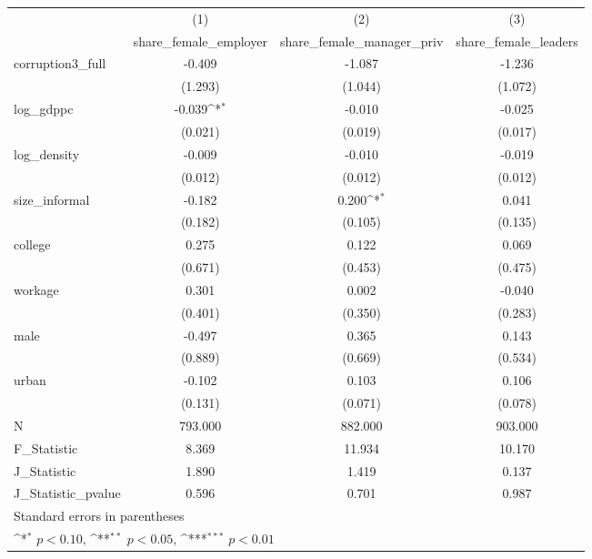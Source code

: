 {
\def\sym#1{\ifmmode^{#1}\else\(^{#1}\)\fi}
\begin{tabular}{l*{3}{c}}
\hline\hline
            &\multicolumn{1}{c}{(1)}&\multicolumn{1}{c}{(2)}&\multicolumn{1}{c}{(3)}\\
            &\multicolumn{1}{c}{share\_female\_employer}&\multicolumn{1}{c}{share\_female\_manager\_priv}&\multicolumn{1}{c}{share\_female\_leaders}\\
\hline
corruption3\_full&      -0.409         &      -1.087         &      -1.236         \\
            &     (1.293)         &     (1.044)         &     (1.072)         \\
[1em]
log\_gdppc   &      -0.039\sym{*}  &      -0.010         &      -0.025         \\
            &     (0.021)         &     (0.019)         &     (0.017)         \\
[1em]
log\_density &      -0.009         &      -0.010         &      -0.019         \\
            &     (0.012)         &     (0.012)         &     (0.012)         \\
[1em]
size\_informal&      -0.182         &       0.200\sym{*}  &       0.041         \\
            &     (0.182)         &     (0.105)         &     (0.135)         \\
[1em]
college     &       0.275         &       0.122         &       0.069         \\
            &     (0.671)         &     (0.453)         &     (0.475)         \\
[1em]
workage     &       0.301         &       0.002         &      -0.040         \\
            &     (0.401)         &     (0.350)         &     (0.283)         \\
[1em]
male        &      -0.497         &       0.365         &       0.143         \\
            &     (0.889)         &     (0.669)         &     (0.534)         \\
[1em]
urban       &      -0.102         &       0.103         &       0.106         \\
            &     (0.131)         &     (0.071)         &     (0.078)         \\
\hline
N           &     793.000         &     882.000         &     903.000         \\
F\_Statistic &       8.369         &      11.934         &      10.170         \\
J\_Statistic &       1.890         &       1.419         &       0.137         \\
J\_Statistic\_pvalue&       0.596         &       0.701         &       0.987         \\
\hline\hline
\multicolumn{4}{l}{\footnotesize Standard errors in parentheses}\\
\multicolumn{4}{l}{\footnotesize \sym{*} \(p<0.10\), \sym{**} \(p<0.05\), \sym{***} \(p<0.01\)}\\
\end{tabular}
}
